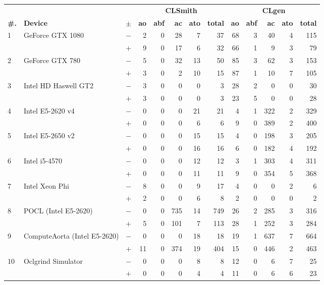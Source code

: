 \begin{tabular}{lll | rrrrr | rrrrr }
  \toprule
  & & & \multicolumn{5}{c|}{\textbf{CLSmith}} & \multicolumn{5}{c}{\textbf{CLgen}} \\
  \textbf{\#.} & \textbf{Device} & $\pm$ &
  \textbf{ao} & \textbf{abf} & \textbf{ac} & \textbf{ato} & \textbf{total} &
  \textbf{ao} & \textbf{abf} & \textbf{ac} & \textbf{ato} & \textbf{total} \\
  \midrule
  \multirow{ 2}{*}{1} & \multirow{ 2}{*}{GeForce GTX 1080} & $-$ & 2 & 0 & 28 & 7 & 37       & 68 & 3 & 40 & 4 & 115 \\& & $+$ & 9 & 0 & 17 & 6 & 32 & 66 & 1 & 9 & 3 & 79 \\
\hline
\multirow{ 2}{*}{2} & \multirow{ 2}{*}{GeForce GTX 780} & $-$ & 5 & 0 & 32 & 13 & 50       & 85 & 3 & 62 & 3 & 153 \\& & $+$ & 3 & 0 & 2 & 10 & 15 & 87 & 1 & 10 & 7 & 105 \\
\hline
\multirow{ 2}{*}{3} & \multirow{ 2}{*}{Intel HD Haswell GT2} & $-$ & 3 & 0 & 0 & 0 & 3       & 28 & 2 & 0 & 0 & 30 \\& & $+$ & 3 & 0 & 0 & 0 & 3 & 23 & 5 & 0 & 0 & 28 \\
\hline
\multirow{ 2}{*}{4} & \multirow{ 2}{*}{Intel E5-2620 v4} & $-$ & 0 & 0 & 0 & 21 & 21       & 4 & 1 & 322 & 2 & 329 \\& & $+$ & 0 & 0 & 0 & 6 & 6 & 9 & 0 & 389 & 2 & 400 \\
\hline
\multirow{ 2}{*}{5} & \multirow{ 2}{*}{Intel E5-2650 v2} & $-$ & 0 & 0 & 0 & 15 & 15       & 4 & 0 & 198 & 3 & 205 \\& & $+$ & 0 & 0 & 0 & 16 & 16 & 6 & 0 & 182 & 4 & 192 \\
\hline
\multirow{ 2}{*}{6} & \multirow{ 2}{*}{Intel i5-4570} & $-$ & 0 & 0 & 0 & 12 & 12       & 3 & 1 & 303 & 4 & 311 \\& & $+$ & 0 & 0 & 0 & 11 & 11 & 9 & 0 & 354 & 5 & 368 \\
\hline
\multirow{ 2}{*}{7} & \multirow{ 2}{*}{Intel Xeon Phi} & $-$ & 8 & 0 & 0 & 9 & 17       & 4 & 0 & 0 & 2 & 6 \\& & $+$ & 2 & 0 & 0 & 6 & 8 & 2 & 0 & 0 & 0 & 2 \\
\hline
\multirow{ 2}{*}{8} & \multirow{ 2}{*}{POCL (Intel E5-2620)} & $-$ & 0 & 0 & 735 & 14 & 749       & 26 & 2 & 285 & 3 & 316 \\& & $+$ & 5 & 0 & 101 & 7 & 113 & 28 & 1 & 252 & 3 & 284 \\
\hline
\multirow{ 2}{*}{9} & \multirow{ 2}{*}{ComputeAorta (Intel E5-2620)} & $-$ & 0 & 0 & 0 & 18 & 18       & 19 & 1 & 637 & 7 & 664 \\& & $+$ & 11 & 0 & 374 & 19 & 404 & 15 & 0 & 446 & 2 & 463 \\
\hline
\multirow{ 2}{*}{10} & \multirow{ 2}{*}{Oclgrind Simulator} & $-$ & 0 & 0 & 0 & 8 & 8       & 12 & 0 & 6 & 7 & 25 \\& & $+$ & 0 & 0 & 0 & 4 & 4 & 11 & 0 & 6 & 6 & 23 \\
  \bottomrule
\end{tabular}

